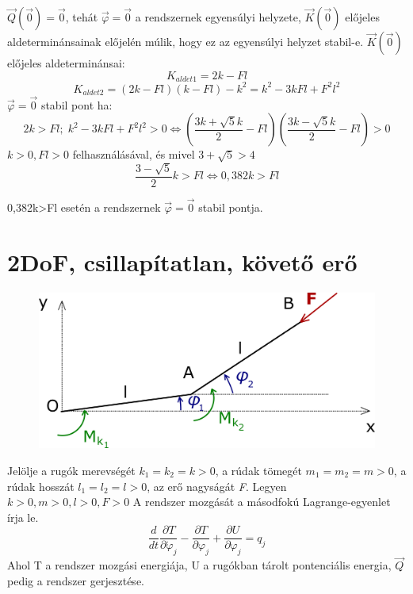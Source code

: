 \documentclass[12pt,twoside]{article}
\newcommand{\pd}[2]{\frac{\partial #1}{\partial #2}}
\begin{document}
$\vec{Q}(\vec0)=\vec0$, tehát $\vec\varphi = \vec0$ a rendszernek egyensúlyi helyzete, $\vec K(\vec0)$ előjeles aldeterminánsainak előjelén múlik, hogy ez az egyensúlyi helyzet stabil-e.\newline
$\vec K(\vec0)$ előjeles aldeterminánsai:
\begin{equation} \label{eq:Newton}
K_{aldet 1}=2k-Fl
\end{equation}
\begin{equation} \label{eq:Newton}
K_{aldet 2}=(2k-Fl)(k-Fl)-k^2=k^2-3kFl+F^2l^2
\end{equation}
$  \vec\varphi=\vec0  $ stabil pont ha:
\begin{equation} \label{eq:Newton}
2k>Fl; \; k^2-3kFl+F^2l^2>0  \Leftrightarrow \left(\frac{3k+\sqrt{5}k}{2}-Fl\right)\left(\frac{3k-\sqrt{5}k}{2}-Fl\right)>0
\end{equation}
  $ k>0 , Fl>0$ felhasználásával, és mivel $3+\sqrt5>4$
\begin{equation} \label{eq:Newton}
\frac{3-\sqrt{5}}{2}k>Fl \Leftrightarrow 0,382k>Fl
\end{equation}

0,382k>Fl esetén a rendszernek $\vec\varphi = \vec 0$ stabil pontja.


\section{2DoF, csillapítatlan, követő erő}%
\begin{figure}[H]
\center
\includegraphics[scale=1]{2szab_koveto}
\end{figure}
 Jelölje a rugók merevségét $  k_1=k_2=k>0 $, a rúdak tömegét $  m_1=m_2=m>0 $, a rúdak hosszát $  l_1=l_2=l>0 $, az erő nagyságát \emph{F}. Legyen $  k>0, m>0, l>0, F>0 $ \newline
A rendszer mozgását a másodfokú Lagrange-egyenlet írja le.
\begin{equation} \label{eq:Newton}
\frac{d}{dt}\pd{T}{\dot\varphi_j}-\pd{T}{\varphi_j}+\pd{U}{\varphi_j}=q_j
\end{equation}
Ahol T a rendszer mozgási energiája, U a rugókban tárolt pontenciális energia, $\vec Q$ pedig a rendszer gerjesztése.
\end{document}
